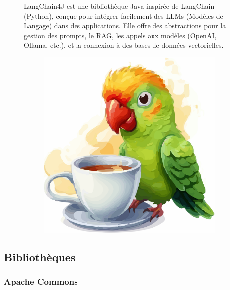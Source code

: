 \documentclass[12pt,a4paper]{report}
\begin{document}
	\begin{figure}[H]
		\begin{minipage}{0.8\textwidth}
			LangChain4J est une bibliothèque Java inspirée de LangChain (Python), conçue pour intégrer facilement des LLMs (Modèles de Langage) dans des applications. Elle offre des abstractions pour la gestion des prompts, le RAG, les appels aux modèles (OpenAI, Ollama, etc.), et la connexion à des bases de données vectorielles.
		\end{minipage}
		\hfill
		\begin{minipage}{0.15\textwidth} 
			\begin{figure}[H]
				\centering
				\includegraphics[width=\linewidth]{langchain4j-logo.png}
				\label{fig:langchain4j-logo}
			\end{figure}
		\end{minipage}
	\end{figure}
	
	\subsection{Bibliothèques}
	
	\subsubsection{Apache Commons}
	
\end{document}
